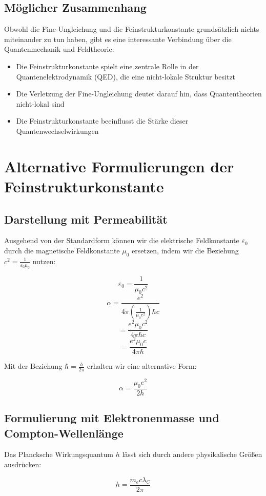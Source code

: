 \documentclass{article}
\begin{document}
	\subsection{Möglicher Zusammenhang}
	Obwohl die Fine-Ungleichung und die Feinstrukturkonstante grundsätzlich nichts miteinander zu tun haben, gibt es eine interessante Verbindung über die Quantenmechanik und Feldtheorie:
	
	\begin{itemize}
		\item Die Feinstrukturkonstante spielt eine zentrale Rolle in der Quantenelektrodynamik (QED), die eine nicht-lokale Struktur besitzt
		\item Die Verletzung der Fine-Ungleichung deutet darauf hin, dass Quantentheorien nicht-lokal sind
		\item Die Feinstrukturkonstante beeinflusst die Stärke dieser Quantenwechselwirkungen
	\end{itemize}
	
	\section{Alternative Formulierungen der Feinstrukturkonstante}
	
	\subsection{Darstellung mit Permeabilität}
	Ausgehend von der Standardform können wir die elektrische Feldkonstante $\varepsilon_0$ durch die magnetische Feldkonstante $\mu_0$ ersetzen, indem wir die Beziehung $c^2 = \frac{1}{\varepsilon_0\mu_0}$ nutzen:
	
	$$\varepsilon_0 = \frac{1}{\mu_0c^2}$$
	$$\alpha = \frac{e^2}{4\pi\left(\frac{1}{\mu_0c^2}\right)\hbar c}$$
	$$= \frac{e^2\mu_0c^2}{4\pi\hbar c}$$
	$$= \frac{e^2\mu_0c}{4\pi\hbar}$$
	
	Mit der Beziehung $\hbar = \frac{h}{2\pi}$ erhalten wir eine alternative Form:
	
	$$\alpha = \frac{\mu_0e^2}{2h}$$
	
	\subsection{Formulierung mit Elektronenmasse und Compton-Wellenlänge}
	Das Plancksche Wirkungsquantum $h$ lässt sich durch andere physikalische Größen ausdrücken:
	
	$$h = \frac{m_e c \lambda_C}{2\pi}$$
	
\end{document}
